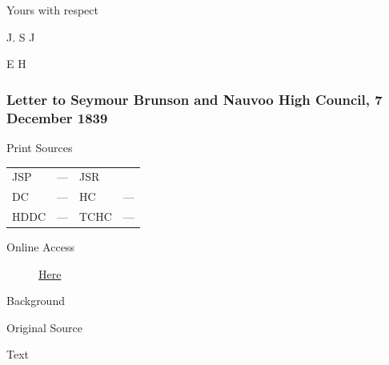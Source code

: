 				\begin{tightright}
					Yours with respect

					J. S J

					E H
				\end{tightright}
				
		\subsubsection{Letter to Seymour Brunson and Nauvoo High Council, 7 December 1839}
			\label{EMS-1839-JS-7-DEC-1839}
			
			\begin{description}
				\item[Print Sources]
			\end{description}

				\begin{tabular}{p{0.5in}p{1in}p{0.5in}p{1in}}
				JSP	 	& ---		& JSR 		&  \\
				DC	 	& ---		& HC 		& --- \\
				HDDC 	& ---		& TCHC 		& --- \\
				\end{tabular}
			
			\begin{description}
				\item[Online Access] \href{https://www.josephsmithpapers.org/paper-summary/letter-to-seymour-brunson-and-nauvoo-high-council-7-december-1839/1}{Here}
			\end{description}
			
			\begin{description}
				\item[Background]
			\end{description}
			
			
			\begin{description}
				\item[Original Source]
			\end{description}
			
			
			\begin{description}
				\item[Text]
			\end{description}
			
